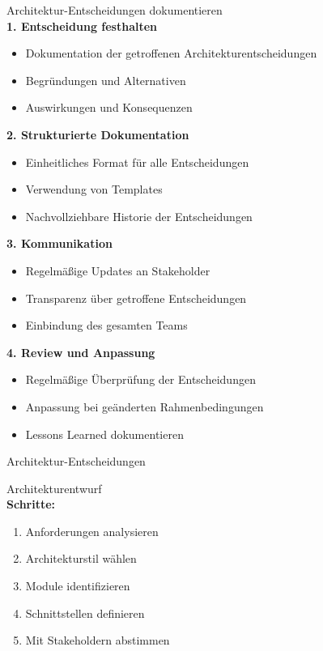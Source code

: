 \begin{corollary}{Architektur-Entscheidungen dokumentieren}\\
\textbf{1. Entscheidung festhalten}
\begin{itemize}
    \item Dokumentation der getroffenen Architekturentscheidungen
    \item Begründungen und Alternativen
    \item Auswirkungen und Konsequenzen
\end{itemize}

\textbf{2. Strukturierte Dokumentation}
\begin{itemize}
    \item Einheitliches Format für alle Entscheidungen
    \item Verwendung von Templates
    \item Nachvollziehbare Historie der Entscheidungen
\end{itemize}

\textbf{3. Kommunikation}
\begin{itemize}
    \item Regelmäßige Updates an Stakeholder
    \item Transparenz über getroffene Entscheidungen
    \item Einbindung des gesamten Teams
\end{itemize}

\textbf{4. Review und Anpassung}
\begin{itemize}
    \item Regelmäßige Überprüfung der Entscheidungen
    \item Anpassung bei geänderten Rahmenbedingungen
    \item Lessons Learned dokumentieren
\end{itemize}
\end{corollary}

\begin{example2}{Architektur-Entscheidungen}\\
\end{example2}


\begin{KR}{Architekturentwurf}\\
\textbf{Schritte:}
\begin{enumerate}
    \item Anforderungen analysieren
    \item Architekturstil wählen
    \item Module identifizieren
    \item Schnittstellen definieren
    \item Mit Stakeholdern abstimmen
\end{enumerate}
\end{KR}

